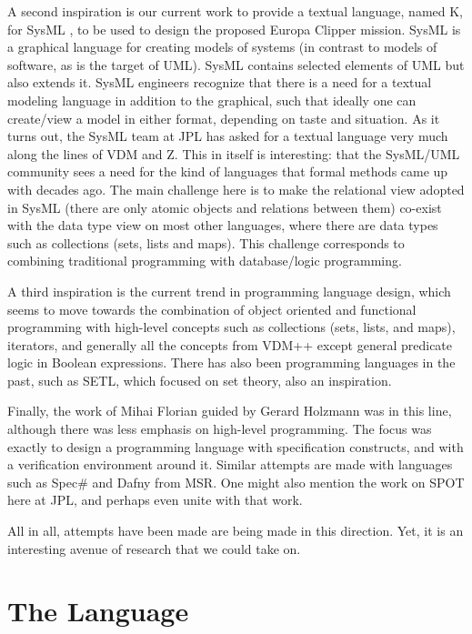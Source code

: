 \documentclass{llncs}
\begin{document}
A second inspiration is our current work to provide a textual language, named K, 
for SysML , to be used to design the proposed Europa Clipper mission. SysML is 
a graphical language for creating models of systems (in contrast to models of 
software, as is the target of UML). SysML contains selected elements of UML but also extends 
it. SysML engineers recognize that there is a need for a textual modeling language 
in addition to the graphical, such that ideally one can create/view a model in 
either format, depending on taste and situation. As it turns out, the SysML team at JPL has 
asked for  a textual language very much along the lines of VDM and Z. This in itself 
is interesting: that the SysML/UML community sees a need for the kind of languages 
that formal methods came up with decades ago. The main challenge here is to make the 
relational view adopted in SysML (there are only atomic objects and relations between 
them) co-exist with the data type view on most other languages, where there are data 
types such as collections (sets, lists and maps). This challenge corresponds to combining traditional programming with database/logic programming.

A third inspiration is the current trend in programming language design, which 
seems to move towards the combination of object oriented and functional programming 
with high-level concepts such as collections (sets, lists, and maps), iterators, 
and generally all the concepts from VDM++ except general predicate logic in Boolean 
expressions. There has also been programming languages in the past, such as SETL, which 
focused on set theory, also an inspiration.

Finally, the work of Mihai Florian guided by Gerard Holzmann was in this line, 
although there was less emphasis on high-level programming. The focus was exactly 
to design a programming language with specification constructs, and with a verification environment around it. Similar 
attempts are made with languages such as Spec\# and Dafny from MSR. One might also 
mention the work on SPOT here at JPL, and perhaps even unite with that work.

All in all, attempts have been made are being made in this direction. Yet, it is 
an interesting avenue of research that we could take on.

\section{The Language}
\end{document}
